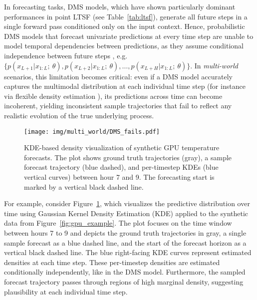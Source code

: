 \documentclass[a4paper,oneside,bibliography=totoc]{scrbook}
\begin{document}
\noindent
In forecasting tasks, DMS models, which have shown particularly dominant performances in point LTSF (see Table~\ref{tab:ltsf}), generate all future steps in a single forward pass conditioned only on the input context.
Hence, probabilistic DMS models that forecast univariate predictions at every time step are unable to model temporal dependencies between predictions, as they assume conditional independence between future steps \cite{taieb_review_2012}, e.g. $\{p(x_{L+1}|x_{1:L};\ \theta), p(x_{L+2}|x_{1:L};\ \theta), \ldots, p(x_{L+H}|x_{1:L};\ \theta)\}$.
In \textit{multi-world} scenarios, this limitation becomes critical: even if a DMS model accurately captures the multimodal distribution at each individual time step (for instance via flexible density estimation \cite{drouin_tactis_2022, bergsma_sutranets_2023, ashok_tactis-2_2023, bergsma_c2far_2022}), its predictions across time can become incoherent, yielding inconsistent sample trajectories that fail to reflect any realistic evolution of the true underlying process.
\begin{figure}
    \centering
    \texttt{[image: img/multi\_world/DMS\_fails.pdf]}
    \caption{KDE-based density visualization of synthetic GPU temperature forecasts. The plot shows ground truth trajectories (gray), a sample forecast trajectory (blue dashed), and per-timestep KDEs (blue vertical curves) between hour 7 and 9. The forecasting start is marked by a vertical black dashed line.}
    \label{fig:dms_fails}
\end{figure}
For example, consider Figure~\ref{fig:dms_fails}, which visualizes the predictive distribution over time using Gaussian Kernel Density Estimation (KDE) \cite{parzen_estimation_1962, scott_multivariate_2015, wang_gaussian_2013} applied to the synthetic data from Figure~\ref{fig:gpu_example}. The plot focuses on the time window between hours 7 to 9 and depicts the ground truth trajectories in gray, a single sample forecast as a blue dashed line, and the start of the forecast horizon as a vertical black dashed line. The blue right-facing KDE curves represent estimated densities at each time step.
These per-timestep densities are estimated conditionally independently, like in the DMS model. 
Furthermore, the sampled forecast trajectory passes through regions of high marginal density, suggesting plausibility at each individual time step. 
\end{document}
